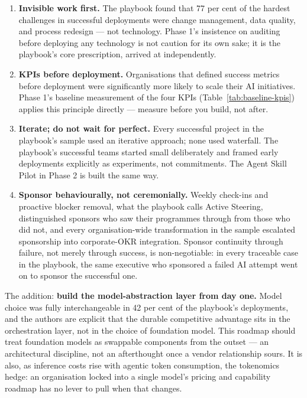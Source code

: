 \begin{enumerate}
  \item \textbf{Invisible work first.} The playbook found that 77 per cent of the hardest challenges in successful deployments were change management, data quality, and process redesign --- not technology. Phase 1's insistence on auditing before deploying any technology is not caution for its own sake; it is the playbook's core prescription, arrived at independently.
  \item \textbf{KPIs before deployment.} Organisations that defined success metrics before deployment were significantly more likely to scale their AI initiatives. Phase 1's baseline measurement of the four KPIs (Table~\ref{tab:baseline-kpis}) applies this principle directly --- measure before you build, not after.
  \item \textbf{Iterate; do not wait for perfect.} Every successful project in the playbook's sample used an iterative approach; none used waterfall. The playbook's successful teams started small deliberately and framed early deployments explicitly as experiments, not commitments. The Agent Skill Pilot in Phase 2 is built the same way.
  \item \textbf{Sponsor behaviourally, not ceremonially.} Weekly check-ins and proactive blocker removal, what the playbook calls Active Steering, distinguished sponsors who saw their programmes through from those who did not, and every organisation-wide transformation in the sample escalated sponsorship into corporate-OKR integration. Sponsor continuity through failure, not merely through success, is non-negotiable: in every traceable case in the playbook, the same executive who sponsored a failed AI attempt went on to sponsor the successful one.
\end{enumerate}

The addition: \textbf{build the model-abstraction layer from day one.} Model choice was fully interchangeable in 42 per cent of the playbook's deployments, and the authors are explicit that the durable competitive advantage sits in the orchestration layer, not in the choice of foundation model. This roadmap should treat foundation models as swappable components from the outset --- an architectural discipline, not an afterthought once a vendor relationship sours. It is also, as inference costs rise with agentic token consumption, the tokenomics hedge: an organisation locked into a single model's pricing and capability roadmap has no lever to pull when that changes.

